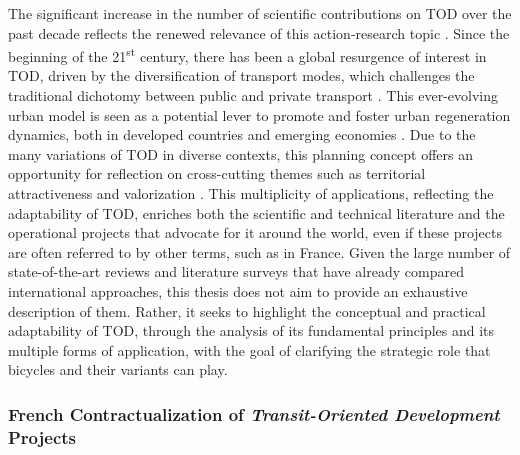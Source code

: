 \begin{refsegment}
The significant increase in the number of scientific contributions on \acrshort{TOD} over the past decade reflects the renewed relevance of this action-research topic \textcolor{blue}{\autocite[2545]{jain_systematic_2020}}. Since the beginning of the 21\textsuperscript{st} century, there has been a global resurgence of interest in \acrshort{TOD}, driven by the diversification of transport modes, which challenges the traditional dichotomy between public and private transport \textcolor{blue}{\autocite[3]{knowles_transit_2019}}. This ever-evolving urban model is seen as a potential lever to promote  and foster urban regeneration dynamics, both in developed countries and emerging economies \textcolor{blue}{\autocite[2191]{goetz_suburban_2013}}. Due to the many variations of \acrshort{TOD} in diverse contexts, this planning concept offers an opportunity for reflection on cross-cutting themes such as territorial attractiveness and valorization \textcolor{blue}{\autocite[34]{stransky_periurbain_2019}}. This multiplicity of applications, reflecting the adaptability of \acrshort{TOD}, enriches both the scientific and technical literature and the operational projects that advocate for it around the world, even if these projects are often referred to by other terms, such as in France. Given the large number of state-of-the-art reviews and literature surveys that have already compared international approaches, this thesis does not aim to provide an exhaustive description of them. Rather, it seeks to highlight the conceptual and practical adaptability of \acrshort{TOD}, through the analysis of its fundamental principles and its multiple forms of application, with the goal of clarifying the strategic role that bicycles and their variants can play.%

\subsubsection*{French Contractualization of \textsl{Transit-Oriented Development} Projects
    \label{chap1:tod-presentation-generale-definition-instruments}
    }


\end{refsegment}
